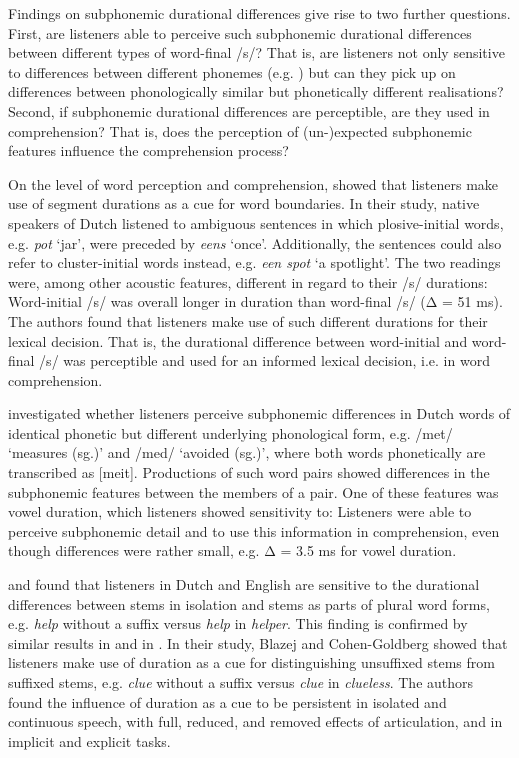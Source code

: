 Findings on subphonemic durational differences give rise to two further questions. First, are listeners able to perceive such subphonemic durational differences between different types of word-final /s/? That is, are listeners not only sensitive to differences between different phonemes (e.g. \cite{Goldstone2010}) but can they pick up on differences between phonologically similar but phonetically different realisations? Second, if subphonemic durational differences are perceptible, are they used in comprehension? That is, does the perception of (un-)expected subphonemic features influence the comprehension process?

On the level of word perception and comprehension, \citet{Shatzman2006} showed that listeners make use of segment durations as a cue for word boundaries. In their study, native speakers of Dutch listened to ambiguous sentences in which plosive-initial words, e.g. \textit{pot} ‘jar’, were preceded by \textit{eens} ‘once’. Additionally, the sentences could also refer to cluster-initial words instead, e.g. \textit{een spot} ‘a spotlight’. The two readings were, among other acoustic features, different in regard to their /s/ durations: Word-initial /s/ was overall longer in duration than word-final /s/ (Δ = 51 ms). The authors found that listeners make use of such different durations for their lexical decision. That is, the durational difference between word-initial and word-final /s/ was perceptible and used for an informed lexical decision, i.e. in word comprehension.

\citet{Warner2004} investigated whether listeners perceive subphonemic differences in Dutch words of identical phonetic but different underlying phonological form, e.g. /met/ ‘measures (sg.)’ and /med/ ‘avoided (sg.)’, where both words phonetically are transcribed as [meit]. Productions of such word pairs showed differences in the subphonemic features between the members of a pair. One of these features was vowel duration, which listeners showed sensitivity to: Listeners were able to perceive subphonemic detail and to use this information in comprehension, even though differences were rather small, e.g. Δ = 3.5 ms for vowel duration. 

\citet{Kemps2005a} and \citet{Kemps2005b} found that listeners in Dutch and English are sensitive to the durational differences between stems in isolation and stems as parts of plural word forms, e.g. \textit{help} without a suffix versus \textit{help} in \textit{helper}. This finding is confirmed by similar results in \citet{Lee2020} and in \citet{Blazej2015}. In their study,  Blazej and Cohen-Goldberg showed that listeners make use of duration as a cue for distinguishing unsuffixed stems from suffixed stems, e.g. \textit{clue} without a suffix versus \textit{clue} in \textit{clueless}. The authors found the influence of duration as a cue to be persistent in isolated and continuous speech, with full, reduced, and removed effects of articulation, and in implicit and explicit tasks. 

